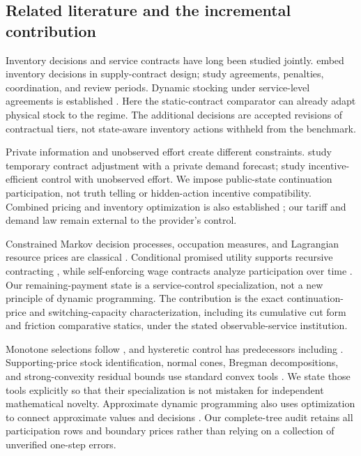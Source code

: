 \documentclass[11pt,letterpaper]{article}
\theoremstyle{definition}
\newcommand{\1}{\mathbf 1}
\begin{document}
\subsection{Related literature and the incremental contribution}
Inventory decisions and service contracts have long been studied jointly. \citet{Henig1997} embed inventory decisions in supply-contract design; \citet{LiangAtkins2013,Sieke2012,Katok2008} study agreements, penalties, coordination, and review periods. Dynamic stocking under service-level agreements is established \citep{Hosseinifard2022,Caggiano2007,Abbasi2022}. Here the static-contract comparator can already adapt physical stock to the regime. The additional decisions are accepted revisions of contractual tiers, not state-aware inventory actions withheld from the benchmark.

Private information and unobserved effort create different constraints. \citet{NasserTurcic2019} study temporary contract adjustment with a private demand forecast; \citet{PlambeckZenios2003} study incentive-efficient control with unobserved effort. We impose public-state continuation participation, not truth telling or hidden-action incentive compatibility. Combined pricing and inventory optimization is also established \citep{FedergruenHeching1999}; our tariff and demand law remain external to the provider's control.

Constrained Markov decision processes, occupation measures, and Lagrangian resource prices are classical \citep{Altman1999}. Conditional promised utility supports recursive contracting \citep{SpearSrivastava1987}, while self-enforcing wage contracts analyze participation over time \citep{ThomasWorrall1988}. Our remaining-payment state is a service-control specialization, not a new principle of dynamic programming. The contribution is the exact continuation-price and switching-capacity characterization, including its cumulative cut form and friction comparative statics, under the stated observable-service institution.

Monotone selections follow \citet{Topkis1978}, and hysteretic control has predecessors including \citet{HippHolzbaur1988}. Supporting-price stock identification, normal cones, Bregman decompositions, and strong-convexity residual bounds use standard convex tools \citep{BoydVandenberghe2004}. We state those tools explicitly so that their specialization is not mistaken for independent mathematical novelty. Approximate dynamic programming also uses optimization to connect approximate values and decisions \citep{DeFariasVanRoy2003}. Our complete-tree audit retains all participation rows and boundary prices rather than relying on a collection of unverified one-step errors.
\end{document}
